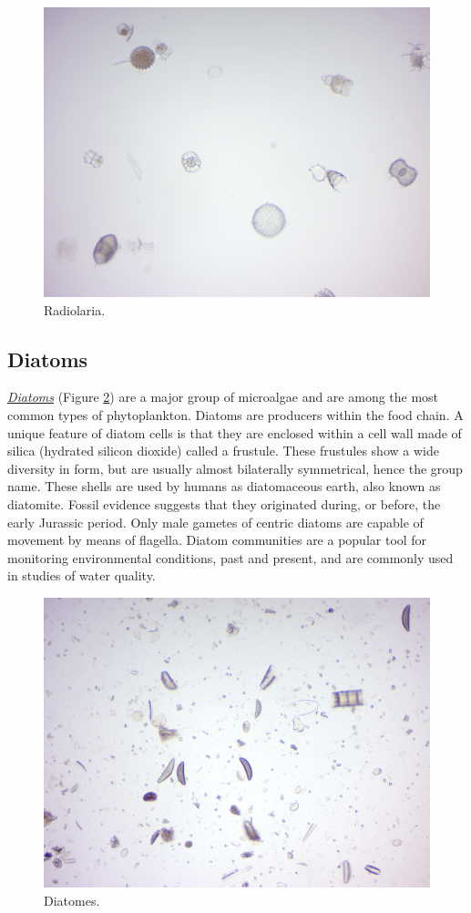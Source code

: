 \begin{figure}

{\centering \includegraphics[width=0.7\linewidth]{./figures/protists/radiolaria} 

}

\caption{Radiolaria.}\label{fig:radiolaria}
\end{figure}

\subsection{Diatoms}\label{diatoms}

\href{https://en.wikipedia.org/wiki/Diatom}{\emph{Diatoms}} (Figure
\ref{fig:diatomes}) are a major group of microalgae and are among the
most common types of phytoplankton. Diatoms are producers within the
food chain. A unique feature of diatom cells is that they are enclosed
within a cell wall made of silica (hydrated silicon dioxide) called a
frustule. These frustules show a wide diversity in form, but are usually
almost bilaterally symmetrical, hence the group name. These shells are
used by humans as diatomaceous earth, also known as diatomite. Fossil
evidence suggests that they originated during, or before, the early
Jurassic period. Only male gametes of centric diatoms are capable of
movement by means of flagella. Diatom communities are a popular tool for
monitoring environmental conditions, past and present, and are commonly
used in studies of water quality.

\begin{figure}

{\centering \includegraphics[width=0.7\linewidth]{./figures/protists/diatomes} 

}

\caption{Diatomes.}\label{fig:diatomes}
\end{figure}

